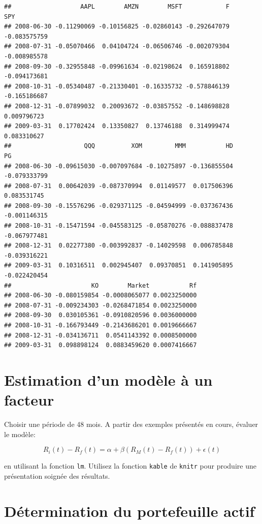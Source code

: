 \documentclass[
]{article}
\begin{document}
\begin{verbatim}
##                   AAPL        AMZN        MSFT            F          SPY
## 2008-06-30 -0.11290069 -0.10156825 -0.02860143 -0.292647079 -0.083575759
## 2008-07-31 -0.05070466  0.04104724 -0.06506746 -0.002079304 -0.008985578
## 2008-09-30 -0.32955848 -0.09961634 -0.02198624  0.165918802 -0.094173681
## 2008-10-31 -0.05340487 -0.21330401 -0.16335732 -0.578846139 -0.165186687
## 2008-12-31 -0.07899032  0.20093672 -0.03857552 -0.148698828  0.009796723
## 2009-03-31  0.17702424  0.13350827  0.13746188  0.314999474  0.083310627
##                    QQQ          XOM         MMM           HD           PG
## 2008-06-30 -0.09615030 -0.007097684 -0.10275897 -0.136855504 -0.079333799
## 2008-07-31  0.00642039 -0.087370994  0.01149577  0.017506396  0.083531745
## 2008-09-30 -0.15576296 -0.029371125 -0.04594999 -0.037367436 -0.001146315
## 2008-10-31 -0.15471594 -0.045583125 -0.05870276 -0.088837478 -0.067977481
## 2008-12-31  0.02277380 -0.003992837 -0.14029598  0.006785848 -0.039316221
## 2009-03-31  0.10316511  0.002945407  0.09370851  0.141905895 -0.022420454
##                      KO        Market           Rf
## 2008-06-30 -0.080159854 -0.0008065077 0.0023250000
## 2008-07-31 -0.009234303 -0.0268471854 0.0023250000
## 2008-09-30  0.030105361 -0.0910820596 0.0036000000
## 2008-10-31 -0.166793449 -0.2143686201 0.0019666667
## 2008-12-31 -0.034136711  0.0541143392 0.0008500000
## 2009-03-31  0.098898124  0.0883459620 0.0007416667
\end{verbatim}

\hypertarget{estimation-dun-moduxe8le-uxe0-un-facteur}{%
\section{Estimation d'un modèle à un
facteur}\label{estimation-dun-moduxe8le-uxe0-un-facteur}}

Choisir une période de 48 mois. A partir des exemples présentés en
cours, évaluer le modèle:

\[
R_i(t) - R_f(t) = \alpha + \beta (R_M(t) - R_f(t)) + \epsilon(t)
\]

en utilisant la fonction \texttt{lm}. Utilisez la fonction
\texttt{kable} de \texttt{knitr} pour produire une présentation soignée
des résultats.

\hypertarget{duxe9termination-du-portefeuille-actif}{%
\section{Détermination du portefeuille
actif}\label{duxe9termination-du-portefeuille-actif}}
\end{document}
